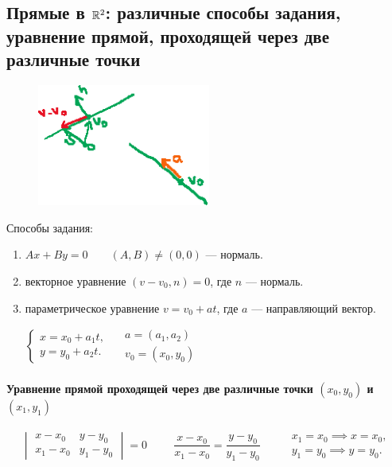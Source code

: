 \subsection{Прямые в $\mathbb{R}^2$: различные способы задания, уравнение прямой, проходящей через две различные точки}

\begin{figure}
    \includegraphics[height=4cm]{lecture26_drawing_1}
    \vspace{-110pt}
\end{figure}

Способы задания:
\begin{enumerate}
    \item $Ax + By = 0 \quad\quad (A, B) \neq (0, 0)$ --- нормаль.
    \item векторное уравнение $(v - v_0, n) = 0$, где $n$ --- нормаль.
    \item параметрическое уравнение $v = v_0 + at$, где $a$ --- направляющий вектор.

        \begin{math}
            \begin{cases}
                x = x_0 + a_1 t, \\
                y = y_0 + a_2 t.
            \end{cases} \quad
            \begin{gathered}
                a = (a_1, a_2) \\
                v_0 = (x_0, y_0)
            \end{gathered}
        \end{math}
\end{enumerate}

\paragraph{Уравнение прямой проходящей через две различные точки $(x_0, y_0)$ и $(x_1, y_1)$}

\begin{equation*}
    \begin{vmatrix} 
        x - x_0 & y - y_0 \\
        x_1 - x_0 & y_1 - y_0
    \end{vmatrix} = 0 \hspace{1cm}
    \frac{x - x_0}{x_1 - x_0} = \frac{y - y_0}{y_1 - y_0} \hspace{1cm}
    \begin{gathered}
        x_1 = x_0 \implies x = x_0, \\
        y_1 = y_0 \implies y = y_0.
    \end{gathered}
\end{equation*}


